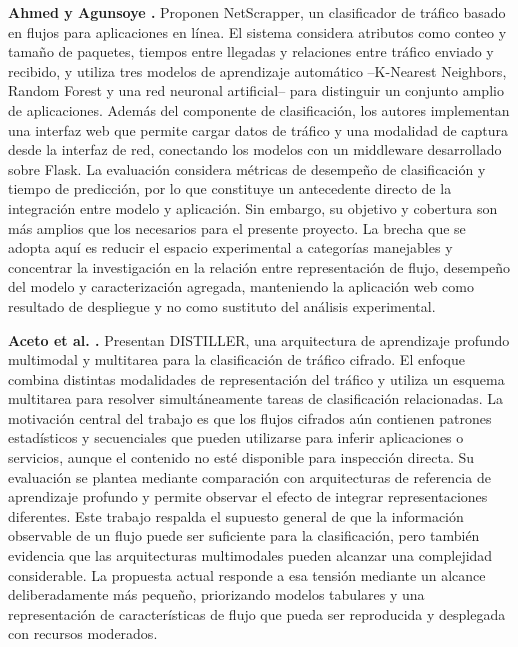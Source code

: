 \documentclass[conference]{IEEEtran}
\begin{document}
\textbf{Ahmed y Agunsoye \cite{ahmed2021}.} Proponen NetScrapper, un clasificador de tráfico basado en flujos para aplicaciones en línea. El sistema considera atributos como conteo y tamaño de paquetes, tiempos entre llegadas y relaciones entre tráfico enviado y recibido, y utiliza tres modelos de aprendizaje automático --K-Nearest Neighbors, Random Forest y una red neuronal artificial-- para distinguir un conjunto amplio de aplicaciones. Además del componente de clasificación, los autores implementan una interfaz web que permite cargar datos de tráfico y una modalidad de captura desde la interfaz de red, conectando los modelos con un middleware desarrollado sobre Flask. La evaluación considera métricas de desempeño de clasificación y tiempo de predicción, por lo que constituye un antecedente directo de la integración entre modelo y aplicación. Sin embargo, su objetivo y cobertura son más amplios que los necesarios para el presente proyecto. La brecha que se adopta aquí es reducir el espacio experimental a categorías manejables y concentrar la investigación en la relación entre representación de flujo, desempeño del modelo y caracterización agregada, manteniendo la aplicación web como resultado de despliegue y no como sustituto del análisis experimental.

\textbf{Aceto et al. \cite{aceto2021}.} Presentan DISTILLER, una arquitectura de aprendizaje profundo multimodal y multitarea para la clasificación de tráfico cifrado. El enfoque combina distintas modalidades de representación del tráfico y utiliza un esquema multitarea para resolver simultáneamente tareas de clasificación relacionadas. La motivación central del trabajo es que los flujos cifrados aún contienen patrones estadísticos y secuenciales que pueden utilizarse para inferir aplicaciones o servicios, aunque el contenido no esté disponible para inspección directa. Su evaluación se plantea mediante comparación con arquitecturas de referencia de aprendizaje profundo y permite observar el efecto de integrar representaciones diferentes. Este trabajo respalda el supuesto general de que la información observable de un flujo puede ser suficiente para la clasificación, pero también evidencia que las arquitecturas multimodales pueden alcanzar una complejidad considerable. La propuesta actual responde a esa tensión mediante un alcance deliberadamente más pequeño, priorizando modelos tabulares y una representación de características de flujo que pueda ser reproducida y desplegada con recursos moderados.
\end{document}
